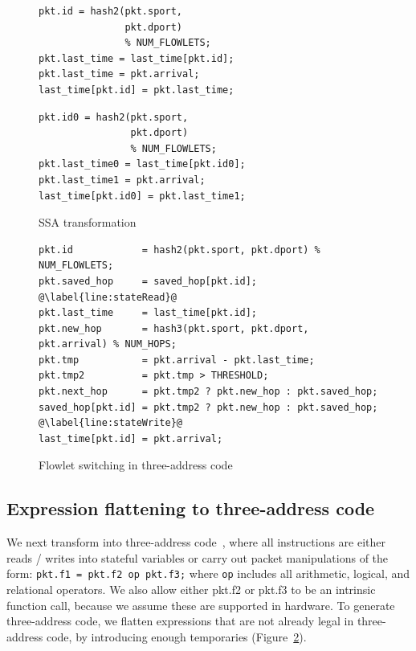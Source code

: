 \begin{figure}[!t]
  \begin{minipage}{0.48\textwidth}
  \begin{small}
  \begin{lstlisting}[style=customc]
pkt.id = hash2(pkt.sport,
               pkt.dport)
               % NUM_FLOWLETS;
pkt.last_time = last_time[pkt.id];
pkt.last_time = pkt.arrival;
last_time[pkt.id] = pkt.last_time;
  \end{lstlisting}
  \end{small}
  \end{minipage}
  \begin{minipage}{0.52\textwidth}
  \begin{small}
  \begin{lstlisting}[style=customc]
pkt.id0 = hash2(pkt.sport,
                pkt.dport)
                % NUM_FLOWLETS;
pkt.last_time0 = last_time[pkt.id0];
pkt.last_time1 = pkt.arrival;
last_time[pkt.id0] = pkt.last_time1;
  \end{lstlisting}
  \end{small}
  \end{minipage}
  \caption{SSA transformation}
\label{fig:ssa}
\end{figure}

\begin{figure}[!t]
\begin{lstlisting}[style=customc]
pkt.id            = hash2(pkt.sport, pkt.dport) % NUM_FLOWLETS;
pkt.saved_hop     = saved_hop[pkt.id]; @\label{line:stateRead}@
pkt.last_time     = last_time[pkt.id];
pkt.new_hop       = hash3(pkt.sport, pkt.dport, pkt.arrival) % NUM_HOPS;
pkt.tmp           = pkt.arrival - pkt.last_time;
pkt.tmp2          = pkt.tmp > THRESHOLD;
pkt.next_hop      = pkt.tmp2 ? pkt.new_hop : pkt.saved_hop;
saved_hop[pkt.id] = pkt.tmp2 ? pkt.new_hop : pkt.saved_hop; @\label{line:stateWrite}@
last_time[pkt.id] = pkt.arrival;
\end{lstlisting}
\caption{Flowlet switching in three-address code}
\label{fig:three_address}
\end{figure}

\subsection{Expression flattening to three-address code}
We next transform into three-address code~\cite{tac}, where all instructions
are either reads / writes into stateful variables or carry out packet
manipulations of the form: \texttt{pkt.f1 = pkt.f2 op pkt.f3;} where
\texttt{op} includes all arithmetic, logical, and relational operators. We also
allow either pkt.f2 or pkt.f3 to be an intrinsic function call, because we
assume these are supported in hardware. To generate three-address code, we
flatten expressions that are not already legal in three-address code, by
introducing enough temporaries
(Figure~\ref{fig:three_address}).

